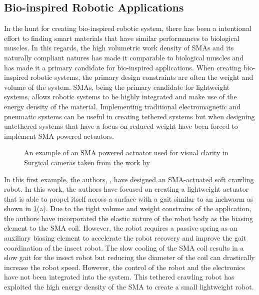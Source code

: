 \subsection{Bio-inspired Robotic Applications}
In the hunt for creating bio-inspired robotic system, there has been a intentional effort to finding smart materials that have similar performances to biological muscles. In this regards, the high volumetric work density of SMAs and its naturally compliant natures has made it comparable to biological muscles and has made it a primary candidate for bio-inspired applications. When creating bio-inspired robotic systems, the primary design constraints are often the weight and volume of the system. SMAs, being the primary candidate for lightweight systems, allows robotic systems to be highly integrated and make use of the energy density of the material. Implementing traditional electromagnetic and pneumatic systems can be useful in creating tethered systems but when designing untethered systems that have a focus on reduced weight have been forced to implement SMA-powered actuators.

\begin{figure}[hbt!]
    \centering
    
    \caption{An example of an SMA powered actuator used for visual clarity in Surgical cameras taken from the work by \todocite}
    \label{fig:bio-examples}
\end{figure}

In this first example, the authors, \todocite, have designed an SMA-actuated soft crawling robot. In this work, the authors have focused on creating a lightweight actuator that is able to propel itself across a surface with a gait similar to an inchworm as shown in \cref{fig:bio-examples}(a). Due to the tight volume and weight constrains of the application, the authors have incorporated the elastic nature of the robot body as the biasing element to the SMA coil. However, the robot requires a passive spring as an auxiliary biasing element to accelerate the robot recovery and improve the gait coordination of the insect robot. The slow cooling of the SMA coil results in a slow gait for the insect robot but reducing the diameter of the coil can drastically increase the robot speed. However, the control of the robot and the electronics have not been integrated into the system. This tethered crawling robot has exploited the high energy density of the SMA to create a small lightweight robot.

